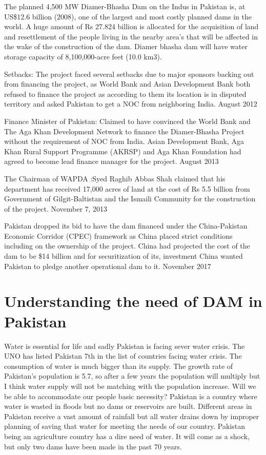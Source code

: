 \documentclass[11pt, journal,letterpaper,compsoc]{IEEEtran}
\begin{document}
The planned 4,500 MW Diamer-Bhasha Dam on the Indus in Pakistan is, at US\$12.6 billion (2008), one of the largest and most costly planned dams in the world. A huge amount of Rs 27.824 billion is allocated for the acquisition of land and resettlement of the people living in the nearby area’s that will be affected in the wake of the construction of the dam. Diamer bhasha dam will have water storage capacity of 8,100,000-acre feet (10.0 km3). 

Setbacks:
The project faced several setbacks due to major sponsors backing out from financing the project, as World Bank and Asian Development Bank both refused to finance the project as according to them its location is in disputed territory and asked Pakistan to get
 a NOC from neighboring India.
\hfill  August 2012

Finance Minister of Pakistan: Claimed to have convinced the World Bank and The Aga Khan Development Network to finance the Diamer-Bhasha Project without the requirement of NOC from India. Asian Development Bank, Aga Khan Rural Support Programme
 (AKRSP) and Aga Khan Foundation had agreed to become lead finance manager for the project.
\hfill  August 2013

The Chairman of WAPDA :Syed Raghib Abbas Shah claimed that his department has received 17,000 acres of land at the cost of Rs 5.5 billion from Government of Gilgit-Baltistan and the Ismaili Community for the construction of the project.
\hfill November 7, 2013 
 
Pakistan dropped its bid to have the dam financed under the China-Pakistan Economic Corridor (CPEC) framework as China placed strict conditions including on the ownership of the project. China had projected the cost of the dam to be \$14 billion and for
securitization of its, investment China wanted Pakistan to pledge another operational dam to it.
\hfill November 2017


\section{Understanding the need of DAM in Pakistan}
Water is essential for life and sadly Pakistan is facing sever water crisis. The UNO has listed Pakistan 7th in the list of countries facing water crisis. The consumption of water is much bigger than its supply. The growth rate of Pakistan’s population is 5.7, so after a few years the population will multiply but I think water supply will not be matching with the population increase. Will we be able to accommodate our people basic necessity?
Pakistan is a country where water is wasted in floods but no dams or reservoirs are built. Different areas in Pakistan receive a vast amount of rainfall but all water drains down by improper planning of saving that water for meeting the needs of our country. Pakistan being an agriculture country has a dire need of water. It will come as a shock, but only two dams have been made in the past 70 years.
\end{document}
